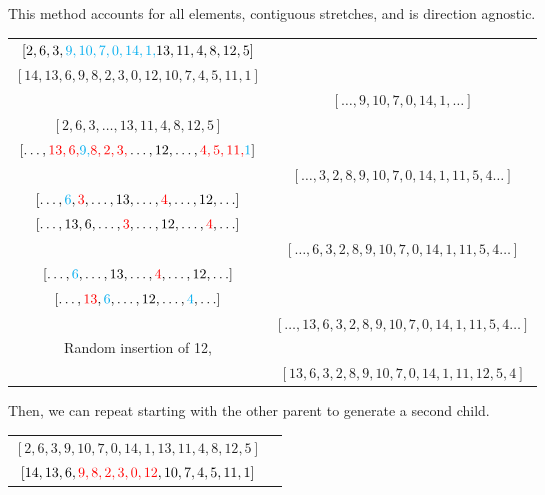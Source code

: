 \documentclass[12pt,letterpaper]{exam}
\begin{document}
\begin{questions}
\begin{solution}
\begin{parts}
				This method accounts for all elements, contiguous stretches, and is direction agnostic.
				
				\begin{center}
					\begin{tabular}{cc}
						\([2,6,3,\textcolor{cyan}{9,10,7,0,14,1,}13,11,4,8,12,5]\) & \\
						\([14,13,6,9,8,2,3,0,12,10,7,4,5,11,1]\) & \\
						
						& \( [\ldots, 9,10,7,0,14,1, \ldots] \) \\
						
						\([2,6,3,\ldots,13,11,4,8,12,5]\) & \\
						\([\ldots,\textcolor{red}{13,6,}\textcolor{cyan}{9,}\textcolor{red}{8,2,3,}\dots,12,\ldots,\textcolor{red}{4,5,11,}\textcolor{cyan}{1}]\) & \\
						
						& \( [\ldots, 3,2,8,9,10,7,0,14,1,11,5,4 \ldots] \) \\
						
						\([ \ldots,\textcolor{cyan}{6},\textcolor{red}{3},\ldots,13,\ldots,\textcolor{red}{4},\ldots,12,\ldots ]\) & \\
						\([ \ldots,13,6,\dots,\textcolor{red}{3},\dots,12,\ldots,\textcolor{red}{4},\ldots ]\) & \\
						
						& \( [\ldots, 6,3,2,8,9,10,7,0,14,1,11,5,4 \ldots] \) \\
						
						\([ \ldots,\textcolor{cyan}{6},\ldots,13,\ldots,\textcolor{red}{4},\ldots,12,\ldots ]\) & \\
						\([ \ldots,\textcolor{red}{13},\textcolor{cyan}{6},\dots,12,\ldots,\textcolor{cyan}{4},\ldots ]\) & \\
						
						& \( [\ldots, 13,6,3,2,8,9,10,7,0,14,1,11,5,4 \ldots] \) \\
						
						Random insertion of 12, & \\
						& \( [ 13,6,3,2,8,9,10,7,0,14,1,11,12,5,4 ] \) \\
					\end{tabular}
				\end{center}
				
				Then, we can repeat starting with the other parent to generate a second child.
				
				\begin{center}
					\begin{tabular}{cc}
						\([2,6,3,9,10,7,0,14,1,13,11,4,8,12,5]\) & \\
						\([14,13,6,\textcolor{red}{9,8,2,3,0,12},10,7,4,5,11,1]\) & \\
						

\end{tabular}
\end{center}
\end{parts}
\end{solution}
\end{questions}
\end{document}
